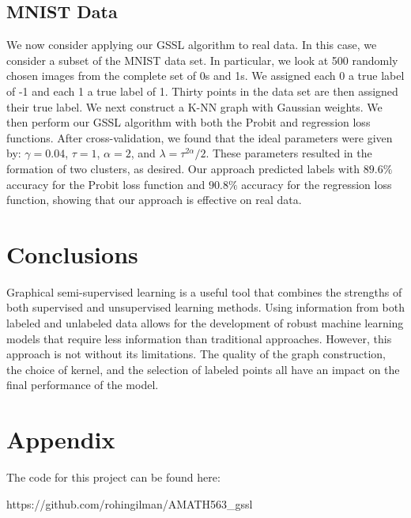 \documentclass[12pt]{amsart}
\begin{document}
\subsection{MNIST Data}
We now consider applying our GSSL algorithm to real data. In this case, we consider a subset of the MNIST data set. In particular, we look at 500 randomly chosen images from the complete set of 0s and 1s. We assigned each 0 a true label of -1 and each 1 a true label of 1. Thirty points in the data set are then assigned their true label. We next construct a K-NN graph with Gaussian weights. We then perform our GSSL algorithm with both the Probit and regression loss functions. After cross-validation, we found that the ideal parameters were given by: $\gamma=0.04$, $\tau=1$, $\alpha=2$, and $\lambda=\tau^{2\alpha}/2$. These parameters resulted in the formation of two clusters, as desired. Our approach predicted labels with $89.6\%$ accuracy for the Probit loss function and $90.8\%$ accuracy for the regression loss function, showing that our approach is effective on real data.

\section{Conclusions}
Graphical semi-supervised learning is a useful tool that combines the strengths of both supervised and unsupervised learning methods. Using information from both labeled and unlabeled data allows for the development of robust machine learning models that require less information than traditional approaches. However, this approach is not without its limitations. The quality of the graph construction, the choice of kernel, and the selection of labeled points all have an impact on the final performance of the model.

\nocite{hoffmann, borovitskiy, sanz-alonso}



\section{Appendix}
The code for this project can be found here:

https://github.com/rohingilman/AMATH563\_gssl
\end{document}
